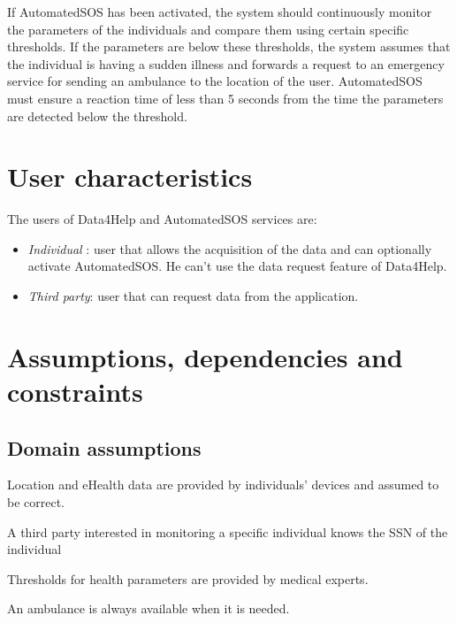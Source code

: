 If AutomatedSOS has been activated, the system should continuously monitor the parameters of the individuals and compare them using certain specific thresholds.
If the parameters are below these thresholds, the system assumes that the individual is having a sudden illness and forwards a request to an emergency service for sending an ambulance to the location of the user.
AutomatedSOS must ensure a reaction time of less than 5 seconds from the time the parameters are detected below the threshold.










\section{User characteristics}
The users of Data4Help and AutomatedSOS services are:

\begin{itemize}
\item \textit{Individual} : user that allows the acquisition of the data and can optionally activate AutomatedSOS. He can't use the data request feature of Data4Help.
\item \textit{Third party}: user that can request data from the application.
\end{itemize}





\section{Assumptions, dependencies and constraints}

\subsection{Domain assumptions}

\begin{dom}
Location and eHealth data are provided by individuals' devices and assumed to be correct.
\end{dom}
\begin{dom}
A third party interested in monitoring a specific individual knows the SSN of the individual
\end{dom}
\begin{dom}
Thresholds for health parameters are provided by medical experts.
\end{dom}
\begin{dom}
An ambulance is always available when it is needed.
\end{dom}

